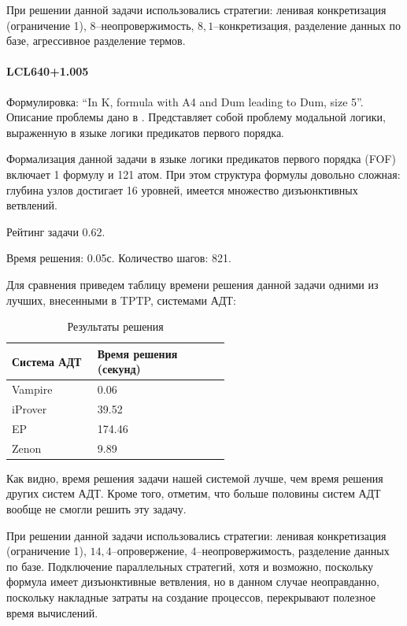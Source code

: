 При решении данной задачи использовались стратегии: ленивая конкретизация (ограничение 1), $8$--неопровержимость, $8,1$--конкретизация, разделение данных по базе, агрессивное разделение термов.


\paragraph{LCL640+1.005}
Формулировка: ``In K, formula with A4 and Dum leading to Dum, size 5''. Описание проблемы дано в \cite{SourceLCL}. Представляет собой проблему модальной логики, выраженную в языке логики предикатов первого порядка.

Формализация данной задачи в языке логики предикатов первого порядка (FOF) включает 1 формулу и 121 атом. При этом структура формулы довольно сложная: глубина узлов достигает 16 уровней, имеется множество дизъюнктивных ветвлений.

Рейтинг задачи 0.62. %

Время решения: 0.05с. Количество шагов: 821.

Для сравнения приведем таблицу времени решения данной задачи одними из лучших, внесенными в TPTP, системами АДТ:

\begin{longtable}[H]{|p{0.2\linewidth}|p{0.35\linewidth}|}
\caption{Результаты решения}\\
\hline
\textbf{Система АДТ} & \textbf{Время решения (секунд)}  \\
\hline
Vampire & 0.06 \\
\hline
iProver & 39.52 \\
\hline
EP & 174.46  \\
\hline
Zenon & 9.89 \\
\hline
\end{longtable}


Как видно, время решения задачи нашей системой лучше, чем время решения других систем АДТ. Кроме того, отметим, что больше половины систем АДТ вообще не смогли решить эту задачу.

При решении данной задачи использовались стратегии: ленивая конкретизация (ограничение 1), $14,4$--опровержение, $4$--неопровержимость, разделение данных по базе. Подключение параллельных стратегий, хотя и возможно, поскольку формула имеет дизъюнктивные ветвления, но в данном случае неоправданно, поскольку накладные затраты на создание процессов, перекрывают полезное время вычислений.



